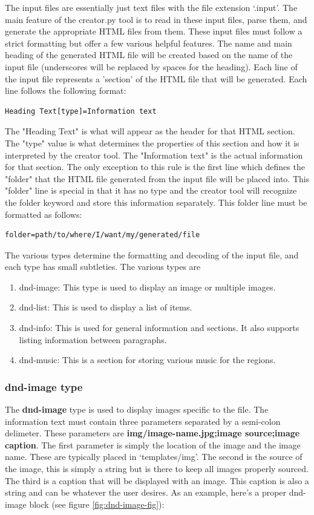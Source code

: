 The input files are essentially just text files with the file extension `.input'. The main feature of the creator.py tool is to read in these input files, parse them, and generate the appropriate HTML files from them. These input files must follow a strict formatting but offer a few various helpful features. The name and main heading of the generated HTML file will be created based on the name of the input file (underscores will be replaced by spaces for the heading). Each line of the input file represents a 'section' of the HTML file that will be generated. Each line follows the following format:
\begin{lstlisting}
Heading Text[type]=Information text
\end{lstlisting}
The "Heading Text" is what will appear as the header for that HTML section. The "type" value is what determines the properties of this section and how it is interpreted by the creator tool. The "Information text" is the actual information for that section. The only exception to this rule is the first line which defines the "folder" that the HTML file generated from the input file will be placed into. This "folder" line is special in that it has no type and the creator tool will recognize the folder keyword and store this information separately. This folder line must be formatted as follows:
\begin{lstlisting}
folder=path/to/where/I/want/my/generated/file
\end{lstlisting}
The various types determine the formatting and decoding of the input file, and each type has small subtleties. The various types are
\begin{enumerate}
	\item dnd-image: This type is used to display an image or multiple images.
 	\item dnd-list: This is used to display a list of items.
 	\item dnd-info: This is used for general information and sections. It also supports listing information between paragraphs.
  	\item dnd-music: This is a section for storing various music for the regions.
\end{enumerate}

\subsubsection{dnd-image type}

The \textbf{dnd-image} type is used to display images specific to the file. The information text must contain three parameters separated by a semi-colon delimeter. These parameters are \textbf{img/image-name.jpg;image source;image caption}. The first parameter is simply the location of the image and the image name. These are typically placed in `templates/img'. The second is the source of the image, this is simply a string but is there to keep all images properly sourced. The third is a caption that will be displayed with an image. This caption is also a string and can be whatever the user desires. As an example, here's a proper dnd-image block (see figure \ref{fig:dnd-image-fig}):

